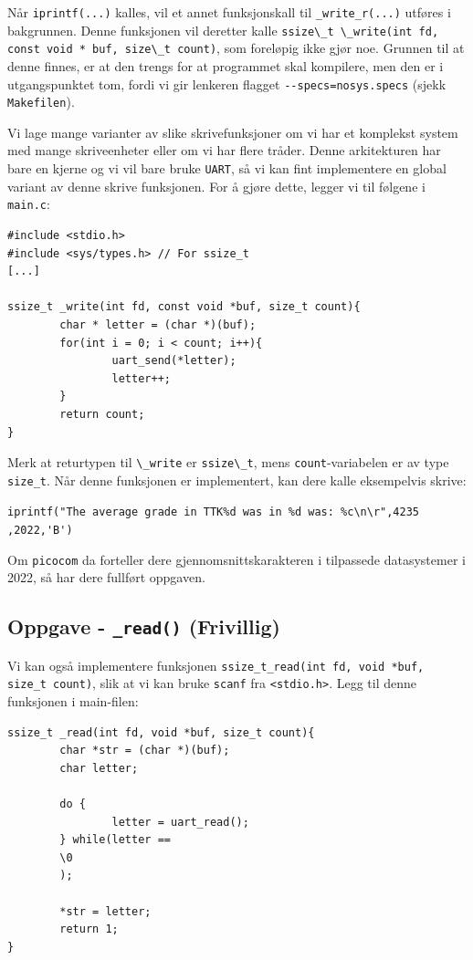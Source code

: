Når \verb|iprintf(...)| kalles, vil et annet funksjonskall til \verb|_write_r(...)| utføres i bakgrunnen. Denne funksjonen vil deretter kalle \lstinline{ssize\_t \_write(int fd, const void * buf, size\_t count)}, som foreløpig ikke gjør noe. Grunnen til at denne finnes, er at den trengs for at programmet skal kompilere, men den er i utgangspunktet tom, fordi vi gir lenkeren flagget \verb|--specs=nosys.specs| (sjekk \verb|Makefilen|).

Vi lage mange varianter av slike skrivefunksjoner om vi har et komplekst system med mange skriveenheter eller om vi har flere tråder. Denne arkitekturen har bare en kjerne og vi vil bare bruke \verb|UART|, så vi kan fint implementere en global variant av denne skrive funksjonen. For å gjøre dette, legger vi til følgene i \verb|main.c|:


\begin{lstlisting}
#include <stdio.h>
#include <sys/types.h> // For ssize_t
[...]

ssize_t _write(int fd, const void *buf, size_t count){
        char * letter = (char *)(buf);
        for(int i = 0; i < count; i++){
                uart_send(*letter);
                letter++;
        }
        return count;
}
\end{lstlisting}

Merk at returtypen til \lstinline{\_write} er \lstinline{ssize\_t}, mens \verb|count|-variabelen er av type \verb|size_t|. Når denne funksjonen er implementert, kan dere kalle eksempelvis skrive:




\verb|iprintf("The average grade in TTK%d was in %d was: %c\n\r",4235|\newline
\verb|,2022,'B')|

Om \verb|picocom| da forteller dere gjennomsnittskarakteren i tilpassede datasystemer i 2022, så har dere fullført oppgaven.




\cprotect\subsection{Oppgave - \lstinline{_read()} (Frivillig)}

Vi kan også implementere funksjonen \lstinline{ssize_t_read(int fd, void *buf, size_t count)}, slik at vi kan bruke \verb|scanf| fra \verb|<stdio.h>|. Legg til denne funksjonen i main-filen:


\begin{lstlisting}
ssize_t _read(int fd, void *buf, size_t count){
        char *str = (char *)(buf);
        char letter;
        
        do {
                letter = uart_read();
        } while(letter == 
        \0
        );
        
        *str = letter;
        return 1;
}
\end{lstlisting}

